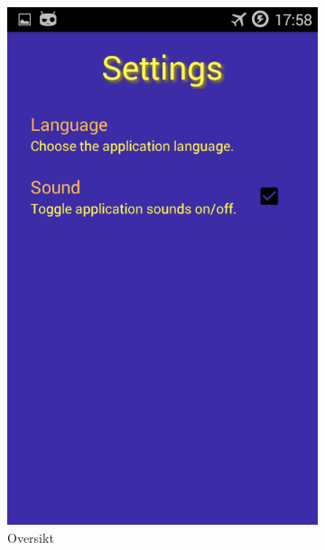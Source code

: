 \begin{figure}[ht]
    \centering
    \begin{subfigure}[b]{0.3\textwidth}
        \includegraphics[width=\textwidth]{./img/bruksanvisning/7.png}
        \caption{Oversikt}
        \label{fig:innstllinger_oversikt}
    \end{subfigure}
    \begin{subfigure}[b]{0.3\textwidth}

\end{subfigure}
\end{figure}
